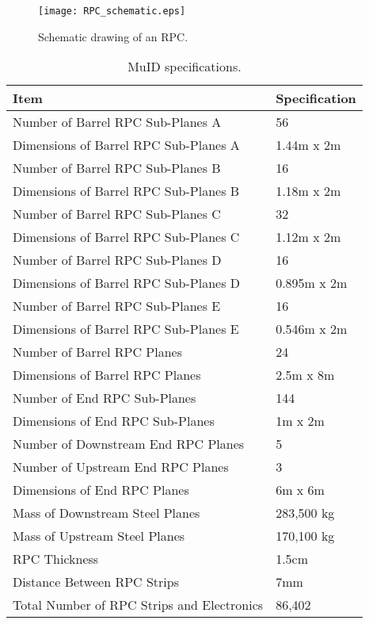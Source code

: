 \documentclass[aps,prl,preprint,groupedaddress]{revtex4}
\begin{document}
\begin{figure}[htp]
\begin{center}
\texttt{[image: RPC\_schematic.eps]}
\caption{\label{FGT_RPC} Schematic drawing of an RPC.} 
\end{center}
\end{figure}

\begin{table}
\centering
  \caption{\label{MID_specs} MuID specifications.}
  \begin{tabular}{| l | l |}
    \hline
Item&Specification \\
    \hline
Number of Barrel RPC Sub-Planes A & 56 \\
Dimensions of Barrel RPC Sub-Planes A &  1.44m x 2m \\
Number of Barrel RPC Sub-Planes B & 16 \\
Dimensions of Barrel RPC Sub-Planes B &  1.18m x 2m \\
Number of Barrel RPC Sub-Planes C & 32 \\
Dimensions of Barrel RPC Sub-Planes C &  1.12m x 2m \\
Number of Barrel RPC Sub-Planes D & 16 \\
Dimensions of Barrel RPC Sub-Planes D &  0.895m x 2m \\
Number of Barrel RPC Sub-Planes E & 16 \\
Dimensions of Barrel RPC Sub-Planes E &  0.546m x 2m \\
Number of Barrel RPC Planes & 24 \\
Dimensions of Barrel RPC Planes & 2.5m x 8m \\
Number of End RPC Sub-Planes & 144 \\
Dimensions of End RPC Sub-Planes & 1m x 2m \\
Number of Downstream End RPC Planes & 5 \\
Number of Upstream End RPC Planes & 3 \\
Dimensions of End RPC Planes & 6m x 6m \\
Mass of Downstream Steel Planes & 283,500 kg \\
Mass of Upstream Steel Planes & 170,100 kg \\
RPC Thickness & 1.5cm \\
Distance Between RPC Strips & 7mm \\
Total Number of RPC Strips and Electronics & 86,402 \\
     \hline
  \end{tabular}
\end{table}
\end{document}
